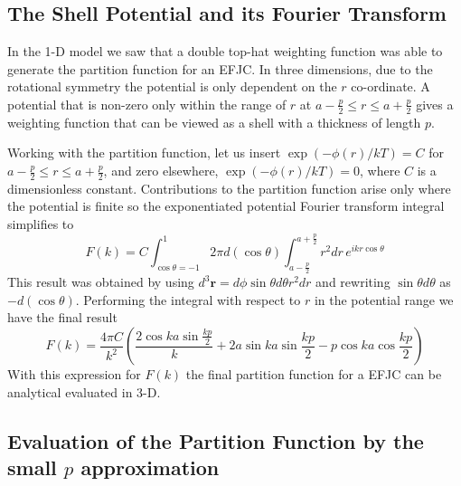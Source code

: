 \subsection{The Shell Potential and its Fourier Transform}

In the 1-D model we saw that a double top-hat weighting function was able to generate the partition function for an EFJC. In three dimensions, due to the rotational symmetry the potential is only dependent on the $r$ co-ordinate. A potential that is non-zero only within the range of $r$ at $a-\frac{p}{2}\leq r\leq a+\frac{p}{2}$ gives a weighting function that can be viewed as a shell with a thickness of length $p$.

Working with the partition function, let us insert $\exp\left(-\phi\left(r\right)/kT\right)=C$ for $a-\frac{p}{2}\leq r\leq a+\frac{p}{2}$, and zero elsewhere, $\exp\left(-\phi\left(r\right)/kT\right)=0$, where $C$ is a dimensionless constant. Contributions to the partition function arise only where the potential is finite so the exponentiated potential Fourier transform integral simplifies to
%
\begin{equation}
F\left(k\right)=C\int_{\cos\theta=-1}^{1}2\pi d\left(\cos\theta\right)\int_{a-\frac{p}{2}}^{a+\frac{p}{2}}r^{2}dr\, e^{ikr\cos\theta}
\end{equation}
%
This result was obtained by using $d^{3}\boldsymbol{r}=d\phi\sin\theta d\theta r^{2}dr$ and rewriting $\sin\theta d\theta$ as $-d\left(\cos\theta\right)$. Performing the integral with respect to $r$ in the potential range
we have the final result
%
\begin{equation}
F\left(k\right)=\frac{4\pi C}{k^{2}}\left(\frac{2\cos ka\sin\frac{kp}{2}}{k}+2a\sin ka\sin\frac{kp}{2}-p\cos ka\cos\frac{kp}{2}\right)\label{PotentialTerm3D}
\end{equation}
%
With this expression for $F\left(k\right)$ the final partition function for a EFJC can be analytical evaluated in 3-D.

\subsection{Evaluation of the Partition Function by the small $p$ approximation}

